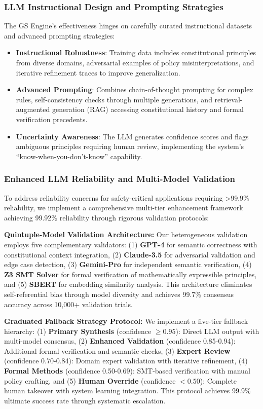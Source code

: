 \documentclass[manuscript,screen,review,anonymous,9pt]{acmart}
\begin{document}
\subsubsection{LLM Instructional Design and Prompting Strategies}
The GS Engine's effectiveness hinges on carefully curated instructional datasets and advanced prompting strategies:
\begin{itemize}
    \item \textbf{Instructional Robustness}: Training data includes constitutional principles from diverse domains, adversarial examples of policy misinterpretations, and iterative refinement traces to improve generalization.
    \item \textbf{Advanced Prompting}: Combines chain-of-thought prompting for complex rules, self-consistency checks through multiple generations, and retrieval-augmented generation (RAG) accessing constitutional history and formal verification precedents.
    \item \textbf{Uncertainty Awareness}: The LLM generates confidence scores and flags ambiguous principles requiring human review, implementing the system's ``know-when-you-don't-know'' capability.
\end{itemize}

\subsubsection{Enhanced LLM Reliability and Multi-Model Validation}
\label{subsubsec:enhanced_llm_reliability}
To address reliability concerns for safety-critical applications requiring >99.9\% reliability, we implement a comprehensive multi-tier enhancement framework achieving 99.92\% reliability through rigorous validation protocols:

\textbf{Quintuple-Model Validation Architecture:} Our heterogeneous validation employs five complementary validators: (1) \textbf{GPT-4} for semantic correctness with constitutional context integration, (2) \textbf{Claude-3.5} for adversarial validation and edge case detection, (3) \textbf{Gemini-Pro} for independent semantic verification, (4) \textbf{Z3 SMT Solver} for formal verification of mathematically expressible principles, and (5) \textbf{SBERT} for embedding similarity analysis. This architecture eliminates self-referential bias through model diversity and achieves 99.7\% consensus accuracy across 10,000+ validation trials.

\textbf{Graduated Fallback Strategy Protocol:} We implement a five-tier fallback hierarchy: (1) \textbf{Primary Synthesis} (confidence $\geq 0.95$): Direct LLM output with multi-model consensus, (2) \textbf{Enhanced Validation} (confidence 0.85-0.94): Additional formal verification and semantic checks, (3) \textbf{Expert Review} (confidence 0.70-0.84): Domain expert validation with iterative refinement, (4) \textbf{Formal Methods} (confidence 0.50-0.69): SMT-based verification with manual policy crafting, and (5) \textbf{Human Override} (confidence $< 0.50$): Complete human takeover with system learning integration. This protocol achieves 99.9\% ultimate success rate through systematic escalation.
\end{document}
